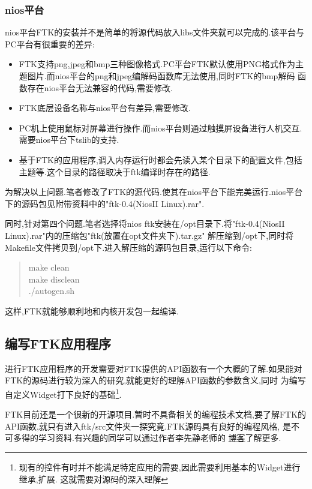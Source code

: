 \documentclass[12pt,a4paper,titlepage]{article}
\begin{document}
\subsubsection{nios平台}
nios平台FTK的安装并不是简单的将源代码放入libs文件夹就可以完成的.该平台与PC平台有很重要的差异:
\begin{itemize}
\item FTK支持png,jpeg和bmp三种图像格式.PC平台FTK默认使用PNG格式作为主题图片.而nios平台的png和jpeg编解码函数库无法使用,同时FTK的bmp解码
函数存在nios平台无法兼容的代码,需要修改.
\item FTK底层设备名称与nios平台有差异,需要修改.
\item PC机上使用鼠标对屏幕进行操作.而nios平台则通过触摸屏设备进行人机交互.需要nios平台下tslib的支持.
\item 基于FTK的应用程序,调入内存运行时都会先读入某个目录下的配置文件,包括主题等.这个目录的路径取决于ftk编译时存在的路径.
\end{itemize}
为解决以上问题.笔者修改了FTK的源代码.使其在nios平台下能完美运行.nios平台下的源码包见附带资料中的"ftk-0.4(NiosII Linux).rar".

同时,针对第四个问题.笔者选择将nios ftk安装在/opt目录下.将"ftk-0.4(NiosII Linux).rar"内的压缩包"ftk(放置在opt文件夹下).tar.gz"
解压缩到/opt下,同时将Makefile文件拷贝到/opt下.进入解压缩的源码包目录,运行以下命令:
\begin{verse}
make clean\\
make disclean\\
./autogen.sh\\
\end{verse}
这样,FTK就能够顺利地和内核开发包一起编译.
\subsection{编写FTK应用程序}
进行FTK应用程序的开发需要对FTK提供的API函数有一个大概的了解.如果能对FTK的源码进行较为深入的研究,就能更好的理解API函数的参数含义,同时
为编写自定义Widget打下良好的基础\footnote{现有的控件有时并不能满足特定应用的需要,因此需要利用基本的Widget进行继承,扩展.
这就需要对源码的深入理解}.

FTK目前还是一个很新的开源项目.暂时不具备相关的编程技术文档,要了解FTK的API函数,就只有进入ftk/src文件夹一探究竟.FTK源码具有良好的编程风格,
是不可多得的学习资料.有兴趣的同学可以通过作者李先静老师的
\href{http://www.limodev.cn/blog/archives/category/ftk\%E5\%B5\%8C\%E5\%85\%A5\%E5\%BC\%8Fgui}{博客}了解更多.
\end{document}
